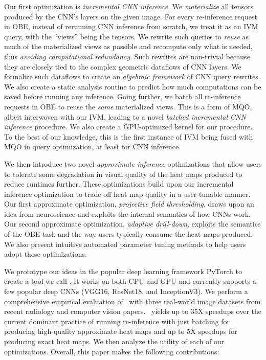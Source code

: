 Our first optimization is \textit{incremental CNN inference}. We \textit{materialize} all tensors produced by the CNN's layers on the given image. For every re-inference request in OBE, instead of rerunning CNN inference from scratch, we treat it as an IVM query, with the ``views'' being the tensors. We rewrite such queries to \textit{reuse} as much of the materialized views as possible and recompute only what is needed, thus \textit{avoiding computational redundancy}. Such rewrites are non-trivial because they are closely tied to the complex geometric dataflows of CNN layers. We formalize such dataflows to create an \textit{algebraic framework} of CNN query rewrites. We also create a static analysis routine to predict how much computations can be saved before running any inference. Going further, we batch all re-inference requests in OBE to reuse the \textit{same} materialized views. This is a form of MQO, albeit interwoven with our IVM, leading to a novel \textit{batched incremental CNN inference} procedure. We also create a GPU-optimized kernel for our procedure. To the best of our knowledge, this is the first instance of IVM being fused with MQO in query optimization, at least for CNN inference.

We then introduce two novel \textit{approximate inference} optimizations that allow users to tolerate some degradation in visual quality of the heat maps produced to reduce runtimes further. These optimizations build upon our incremental inference optimization to trade off heat map quality in a user-tunable manner. Our first approximate optimization, \textit{projective field thresholding}, draws upon an idea from neuroscience and exploits the internal semantics of how CNNs work. Our second approximate optimization, \textit{adaptive drill-down}, exploits the semantics of the OBE task and the way users typically consume the heat maps produced. We also present intuitive automated parameter tuning methods to help users adopt these optimizations.

We prototype our ideas in the popular deep learning framework PyTorch to create a tool we call \system. It works on both CPU and GPU and currently supports a few popular deep CNNs (VGG16, ResNet18, and InceptionV3). We perform a comprehensive empirical evaluation of \system ~with three real-world image datasets from recent radiology and computer vision papers. \system ~yields up to $35$X speedups over the current dominant practice of running re-inference with just batching for producing high-quality approximate heat maps and up to $5$X speedups for producing exact heat maps. We then analyze the utility of each of our optimizations. Overall, this paper makes the following contributions:

